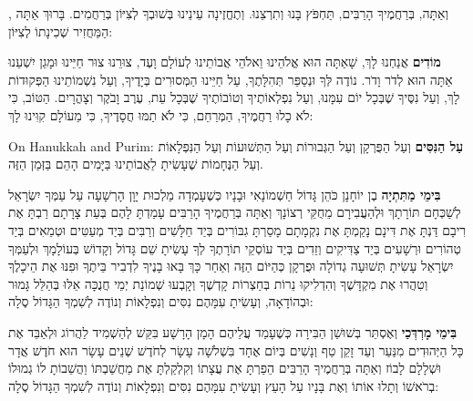 וְאַתָּה, בְּרַחֲמֶיךָ הָרַבִּים, תַּחְפֹּץ בָּנוּ וְתִרְצֵנוּ. וְתֶחֱזֶינָה עֵינֵינוּ בְּשׁוּבְךָ לְצִיּוֹן בְּרַחֲמִים. בָּרוּךְ אַתָּה \Shem{}, הַמַּחֲזִיר שְׁכִינָתוֹ לְצִיּוֹן:

\textbf{מוֹדִים} אֲנַחְנוּ לָךְ, שָׁאַתָּה הוּא \Shem{} אֱלֹהֵינוּ וֵאלֹהֵי אֲבוֹתֵינוּ לְעוֹלָם וָעֶד, צוּרֵנוּ צוּר חַיֵּינוּ וּמָגֵן יִשְׁעֵנוּ אַתָּה הוּא לְדֹר וָדֹר. נוֹדֶה לְּךָ וּנְסַפֵּר תְּהִלָּתֶךָ, עַל חַיֵּינוּ הַמְּסוּרִים בְּיָדֶיךָ, וְעַל נִשְׁמוֹתֵינוּ הַפְּקוּדוֹת לָךְ, וְעַל נִסֶּיךָ שֶׁבְּכָל יוֹם עִמָּנוּ, וְעַל נִפְלְאוֹתֶיךָ וְטוֹבוֹתֶיךָ שֶׁבְּכָל עֵת, עֶרֶב וָבֹקֶר וְצָהֳרָיִם. הַטּוֹב, כִּי לֹא כָלוּ רַחֲמֶיךָ, הַמְּרַחֵם, כִּי לֹא תַמּוּ חֲסָדֶיךָ, כִּי מֵעוֹלָם קִוִּינוּ לָךְ:

\begin{seasonal}{On Hanukkah and Purim:}
\textbf{עַל הַנִּסִּים} וְעַל הַפֻּרְקָן וְעַל הַגְּבוּרוֹת וְעַל הַתְּשׁוּעוֹת וְעַל הַנִּפְלָאוֹת וְעַל הַנֶּחָמוֹת שֶׁעָשִׂיתָ לַאֲבוֹתֵינוּ בַּיָּמִים הָהֵם בַּזְּמַן הַזֶּה.

\textbf{בִּימֵי מַתִּתְיָה} בֶן יוֹחָנָן כֹּהֵן גָּדוֹל חַשְׁמוֹנָאִי וּבָנָיו כְּשֶׁעָמְדָה מַלְכוּת יָוָן הָרְשָׁעָה עַל עַמְּךָ יִשְׂרָאֵל לְשַׁכְּחָם תּוֹרָתָךְ וּלְהַעֲבִירָם מֵחֻקֵּי רְצוֹנָךְ וְאַתָּה בְּרַחֲמֶיךָ הָרַבִּים עָמַדְתָּ לָהֶם בְּעֵת צָרָתָם רַבְתָּ אֶת רִיבָם דַּנְתָּ אֶת דִּינָם נָקַמְתָּ אֶת נִקְמָתָם מָסַרְתָּ גִבּוֹרִים בְּיַד חַלָּשִׁים וְרַבִּים בְּיַד מְעַטִּים וּטְמֵאִים בְּיַד טְהוֹרִים וּרְשָׁעִים בְּיַד צַדִּיקִים וְזֵדִים בְּיַד עוֹסְקֵי תוֹרָתֶךָ לְךָ עָשִׂיתָ שֵׁם גָּדוֹל וְקָדוֹשׁ בְּעוֹלָמָךְ וּלְעַמְּךָ יִשְׂרָאֵל עָשִׂיתָ תְּשׁוּעָה גְדוֹלָה וּפֻרְקָן כְּהַיּוֹם הַזֶּה וְאַחַר כָּךְ בָּאוּ בָנֶיךָ לִדְבִיר בֵּיתֶךָ וּפִנּוּ אֶת הֵיכָלֶךָ וְטִהֲרוּ אֶת מִקְדָּשֶׁךָ וְהִדְלִיקוּ נֵרוֹת בְּחַצְרוֹת קָדְשֶׁךָ וְקָבְעוּ שְׁמוֹנַת יְמֵי חֲנֻכָּה אֵלּוּ בְּהַלֵּל גָּמוּר וּבְהוֹדָאָה, וְעָשִׂיתָ עִמָּהֶם נִסִּים וְנִפְלָאוֹת וְנוֹדֶה לְשִׁמְךָ הַגָּדוֹל סֶלָה:

\textbf{בִּימֵי מָרְדְּכַי} וְאֶסְתֵּר בְּשׁוּשַׁן הַבִּירָה כְּשֶׁעָמַד עֲלֵיהֶם הָמָן הָרָשָׁע בִּקֵּשׁ לְהַשְׁמִיד לַהֲרוֹג וּלְאַבֵּד אֶת כָּל הַיְּהוּדִים מִנַּעַר וְעַד זָקֵן טַף וְנָשִׁים בְּיוֹם אֶחָד בִּשְׁלֹשָׁה עָשָׂר לְחֹדֶשׁ שְׁנֵים עָשָׂר הוּא חֹדֶשׁ אֲדָר וּשְׁלָלָם לָבוֹז וְאַתָּה בְּרַחֲמֶיךָ הָרַבִּים הֵפַרְתָּ אֶת עֲצָתוֹ וְקִלְקַלְתָּ אֶת מַחֲשַׁבְתּוֹ וַהֲשֵׁבוֹתָ לוֹ גְמוּלוֹ בְרֹאשׁוֹ וְתָלוּ אוֹתוֹ וְאֶת בָּנָיו עַל הָעֵץ וְעָשִׂיתָ עִמָּהֶם נִסִּים וְנִפְלָאוֹת וְנוֹדֶה לְשִׁמְךָ הַגָּדוֹל סֶלָה:
\end{seasonal}

